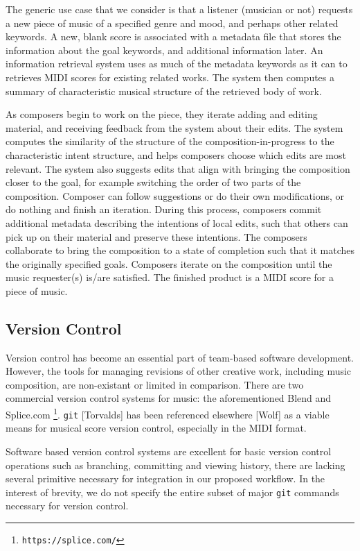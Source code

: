 \documentclass[final,authoryear,5p,times,twocolumn]{elsarticle}
\begin{document}
The generic use case that we consider is that a listener (musician or not) requests a new piece of music of a specified genre and mood, and perhaps other related keywords. A new, blank score is associated with a metadata file that stores the information about the goal keywords, and additional information later. An information retrieval system uses as much of the metadata keywords as it can to retrieves MIDI scores for existing related works. The system then computes a summary of characteristic musical structure of the retrieved body of work.

As composers begin to work on the piece, they iterate adding and editing material, and receiving feedback from the system about their edits. The system computes the similarity of the structure of the composition-in-progress to the characteristic intent structure, and helps composers choose which edits are most relevant. The system also suggests edits that align with bringing the composition closer to the goal, for example switching the order of two parts of the composition. Composer can follow suggestions or do their own modifications, or do nothing and finish an iteration. During this process, composers commit additional metadata describing the intentions of local edits, such that others can pick up on their material and preserve these intentions. The composers collaborate to bring the composition to a state of completion such that it matches the originally specified goals. Composers iterate on the composition until the music requester(s) is/are satisfied. The finished product is a MIDI score for a piece of music.
 


\subsection{Version Control}

Version control has become an essential part of team-based software development. However, the tools for managing
revisions of other creative work, including music composition, are non-existant or limited in comparison. There are
two commercial version control systems for music: the aforementioned Blend and Splice.com \footnote{\texttt{https://splice.com/}}. \texttt{git} [Torvalds] has been referenced elsewhere [Wolf] as a viable means for musical score version control, especially in the MIDI format.

Software based version control systems are excellent for basic version control operations such as branching, committing and viewing history, there are lacking several primitive necessary for integration in our proposed workflow. In the interest of brevity, we do not specify the entire subset of major \texttt{git} commands necessary for version control.
\end{document}
